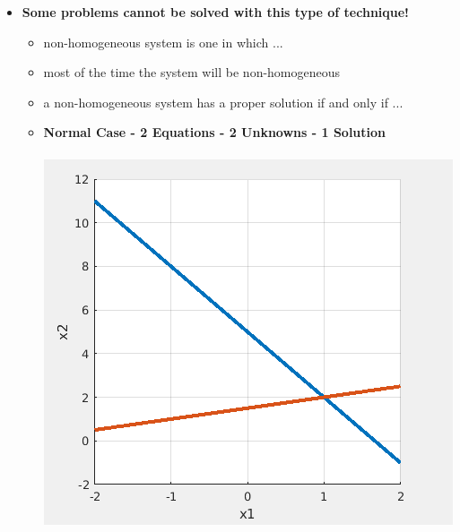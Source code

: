 \documentclass[11pt]{article}
\newcommand{\B}{\color{blue}}
\newcommand{\PR}{\color{mypurple}}
\begin{document}
\begin{itemize}
	\newpage
\Large
\item \textbf{ Some problems cannot be solved with this type of technique!} \\	
\begin{itemize}
\item {\PR non-homogeneous} system is one in which ... \vspace{10mm}\\
\item most of the time the system will be {\PR non-homogeneous} \vspace{10mm}\\
\item a {\PR non-homogeneous} system has a {\B proper solution} if and only if ...\vspace{10mm}\\
	

\newpage
\item {\bf Normal Case - 2 Equations - 2 Unknowns - 1 Solution} \\\\ \includegraphics[scale=1]{lecture4_fig1.png} \\\\
\\\\


\end{itemize}
\end{itemize}
\end{document}
